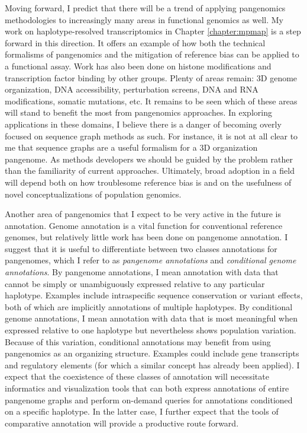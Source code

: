 \documentclass[11pt]{ucthesis}
\begin{document}
Moving forward, I predict that there will be a trend of applying pangenomics methodologies to increasingly many areas in functional genomics as well. My work on haplotype-resolved transcriptomics in Chapter \ref{chapter:mpmap} is a step forward in this direction. It offers an example of how both the technical formalisms of pangenomics and the mitigation of reference bias can be applied to a functional assay. Work has also been done on histone modifications\cite{groza2020personalized} and transcription factor binding\cite{grytten2019graph} by other groups. Plenty of areas remain: 3D genome organization, DNA accessibility, perturbation screens, DNA and RNA modifications, somatic mutations, etc. It remains to be seen which of these areas will stand to benefit the most from pangenomics approaches. In exploring applications in these domains, I believe there is a danger of becoming overly focused on sequence graph methods as such. For instance, it is not at all clear to me that sequence graphs are a useful formalism for a 3D organization pangenome. As methods developers we should be guided by the problem rather than the familiarity of current approaches. Ultimately, broad adoption in a field will depend both on how troublesome reference bias is and on the usefulness of novel conceptualizations of population genomics.

Another area of pangenomics that I expect to be very active in the future is annotation. Genome annotation is a vital function for conventional reference genomes, but relatively little work has been done on pangenome annotation. I suggest that it is useful to differentiate between two classes annotations for pangenomes, which I refer to as \emph{pangenome annotations} and \emph{conditional genome annotations}. By pangenome annotations, I mean annotation with data that cannot be simply or unambiguously expressed relative to any particular haplotype. Examples include intraspecific sequence conservation or variant effects, both of which are implicitly annotations of multiple haplotypes. By conditional genome annotations, I mean annotation with data that is most meaningful when expressed relative to one haplotype but nevertheless shows population variation. Because of this variation, conditional annotations may benefit from using pangenomics as an organizing structure. Examples could include gene transcripts and regulatory elements (for which a similar concept has already been applied\cite{tognon2021grafimo}). I expect that the coexistence of these classes of annotation will necessitate informatics and visualization tools that can both express annotations of entire pangenome graphs and perform on-demand queries for annotations conditioned on a specific haplotype. In the latter case, I further expect that the tools of comparative annotation will provide a productive route forward\cite{armstrong2019whole}.
\end{document}
